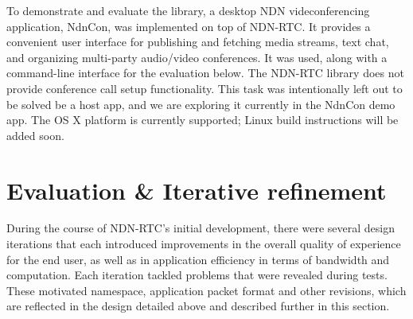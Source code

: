 \documentclass{icn/sig-alternate-2013} %
\newcommand{\ndnrtcName}{NDN-RTC} %
\newcommand{\ndnconName}{NdnCon}
\begin{document}

To demonstrate and evaluate the library, a desktop NDN videconferencing application, \ndnconName{}, \cite{ndncon} was implemented on top of \ndnrtcName{}. It provides a convenient user interface for publishing and fetching media streams, text chat, and organizing multi-party audio/video conferences. It was used, along with a command-line interface for the evaluation below.
The \ndnrtcName{} library does not provide conference call setup functionality. This task was intentionally left out to be solved be a host app, and we are exploring it currently in the \ndnconName{} demo app.  The OS X platform is currently supported; Linux build instructions will be added soon. %

\section{Evaluation \& Iterative refinement}
\label{sec:eval} 
During the course of \ndnrtcName{}'s initial development, there were several  design iterations that each introduced improvements in the overall quality of experience for the end user, as well as in application efficiency in terms of bandwidth and computation. Each iteration tackled problems that were revealed during tests. These motivated namespace, application packet format and other revisions, which are reflected in the design detailed above and described further in this section. 
\end{document}
